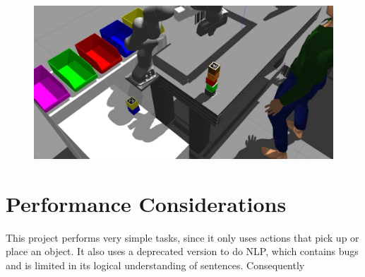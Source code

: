 \begin{figure} [h]
\centering
\includegraphics[width=0.6
\textwidth]{figures/Magistrale/ass_4}
\caption[Second Part of BlockB Assembly Simulation]{
\label{fig:ass_4}}
\end{figure} 


\section{Performance Considerations}\label{sec:perf_consid}

This project performs very simple tasks, since it only uses actions that pick up or place an object. 
It also uses a deprecated version to do NLP, which contains bugs and is limited in its logical understanding of sentences.
Consequently 

